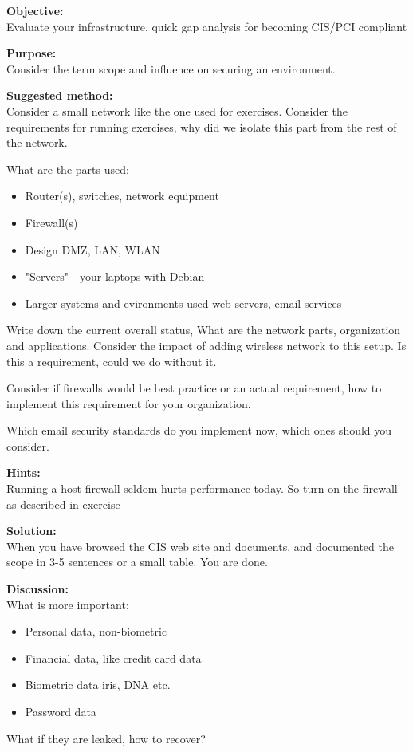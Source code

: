 \documentclass[a4paper,11pt,notitlepage]{report}
\begin{document}
{\bf Objective:}\\
Evaluate your infrastructure, quick gap analysis for becoming CIS/PCI compliant

{\bf Purpose:}\\
Consider the term scope and influence on securing an environment.

{\bf Suggested method:}\\
Consider a small network like the one used for exercises. Consider the requirements for running exercises, why did we isolate this part from the rest of the network.

What are the parts used:
\begin{itemize}
\item Router(s), switches, network equipment
\item Firewall(s)
\item Design DMZ, LAN, WLAN
\item "Servers" - your laptops with Debian
\item Larger systems and evironments used web servers, email services
\end{itemize}

Write down the current overall status, What are the network parts, organization and applications. Consider the impact of adding wireless network to this setup. Is this a requirement, could we do without it.

Consider if firewalls would be best practice or an actual requirement, how to implement this requirement for your organization.

Which email security standards do you implement now, which ones should you consider.

{\bf Hints:}\\
Running a host firewall seldom hurts performance today. So turn on the firewall as described in exercise 

{\bf Solution:}\\
When you have browsed the CIS web site and documents, and documented the scope in 3-5 sentences or a small table. You are done.

{\bf Discussion:}\\
What is more important:

\begin{itemize}
\item Personal data, non-biometric
\item Financial data, like credit card data
\item Biometric data iris, DNA etc.
\item Password data
\end{itemize}

What if they are leaked, how to recover?
\end{document}
